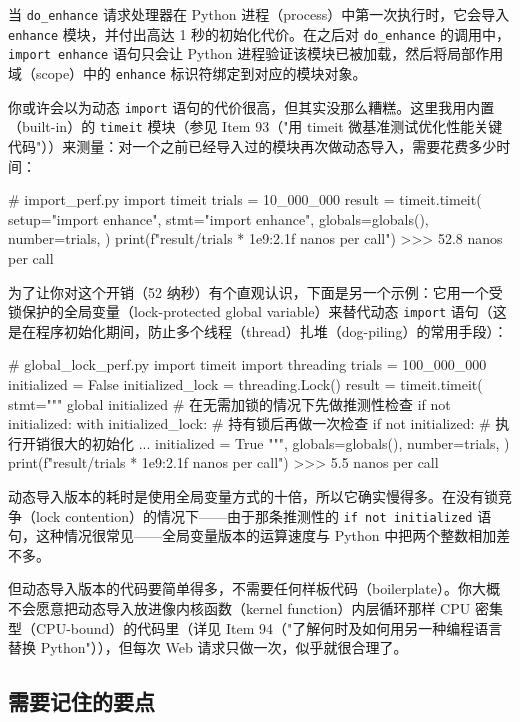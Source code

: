 当 \texttt{do\_enhance} 请求处理器在 Python 进程（process）中第一次执行时，它会导入 \texttt{enhance} 模块，并付出高达 1 秒的初始化代价。在之后对 \texttt{do\_enhance} 的调用中，\texttt{import enhance} 语句只会让 Python 进程验证该模块已被加载，然后将局部作用域（scope）中的 \texttt{enhance} 标识符绑定到对应的模块对象。

你或许会以为动态 \texttt{import} 语句的代价很高，但其实没那么糟糕。这里我用内置（built-in）的 \texttt{timeit} 模块（参见 Item 93（"用 timeit 微基准测试优化性能关键代码"））来测量：对一个之前已经导入过的模块再次做动态导入，需要花费多少时间：

\begin{codebox}[python]
# import_perf.py
import timeit
trials = 10_000_000
result = timeit.timeit(
    setup="import enhance",
    stmt="import enhance",
    globals=globals(),
    number=trials,
)
print(f"{result/trials * 1e9:2.1f} nanos per call")
>>>
52.8 nanos per call
\end{codebox}

为了让你对这个开销（52 纳秒）有个直观认识，下面是另一个示例：它用一个受锁保护的全局变量（lock-protected global variable）来替代动态 \texttt{import} 语句（这是在程序初始化期间，防止多个线程（thread）扎堆（dog-piling）的常用手段）：

\begin{codebox}[python]
# global_lock_perf.py
import timeit
import threading
trials = 100_000_000
initialized = False
initialized_lock = threading.Lock()
result = timeit.timeit(
    stmt="""
global initialized
# 在无需加锁的情况下先做推测性检查
if not initialized:
    with initialized_lock:
        # 持有锁后再做一次检查
        if not initialized:
            # 执行开销很大的初始化
            ...
            initialized = True
""",
    globals=globals(),
    number=trials,
)
print(f"{result/trials * 1e9:2.1f} nanos per call")
>>>
5.5 nanos per call
\end{codebox}

动态导入版本的耗时是使用全局变量方式的十倍，所以它确实慢得多。在没有锁竞争（lock contention）的情况下——由于那条推测性的 \texttt{if not initialized} 语句，这种情况很常见——全局变量版本的运算速度与 Python 中把两个整数相加差不多。

但动态导入版本的代码要简单得多，不需要任何样板代码（boilerplate）。你大概不会愿意把动态导入放进像内核函数（kernel function）内层循环那样 CPU 密集型（CPU-bound）的代码里（详见 Item 94（"了解何时及如何用另一种编程语言替换 Python"）），但每次 Web 请求只做一次，似乎就很合理了。

\subsection{需要记住的要点}

